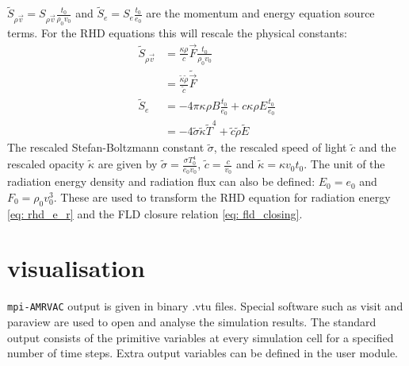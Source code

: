$\tilde{S}_{\rho \vec{v}} = S_{\rho \vec{v}} \frac{t_0}{\rho_0 v_0}$ and $\tilde{S}_e = S_e \frac{t_0}{e_0}$ are the momentum and energy equation source terms. For the RHD equations this will rescale the physical constants:
\begin{align}
	\tilde{S}_{\rho \vec{v}} &=  \frac{\kappa \rho}{c} \vec{F} \frac{t_0}{\rho_0 v_0} \\
							 &=  \frac{\tilde{\kappa}\tilde{\rho}}{\tilde{c}} \tilde{\vec{F}} \\
	\tilde{S}_e &= -4\pi \kappa\rho B \frac{t_0}{e_0}  + c \kappa \rho E \frac{t_0}{e_0} \\
				&= -4 \tilde{\sigma} \tilde{\kappa} \tilde{T}^4 + \tilde{c} \tilde{\rho} \tilde{E}
\end{align}
The rescaled Stefan-Boltzmann constant $\tilde{\sigma}$, the rescaled speed of light $\tilde{c}$ and the rescaled opacity $\tilde{\kappa}$ are given by $\tilde{\sigma} = \frac{\sigma T_0^4}{e_0 v_0}$, $\tilde{c} = \frac{c}{v_0}$ and $\tilde{\kappa} = \kappa v_0 t_0$. The unit of the radiation energy density and radiation flux can also be defined: $E_0 = e_0$ and $F_0 = \rho_0 v_0^3$. These are used to transform the RHD equation for radiation energy \eqref{eq: rhd_e_r} and the FLD closure relation \eqref{eq: fld_closing}. 

\section{visualisation}
\texttt{mpi-AMRVAC} output is given in binary .vtu files. Special software such as visit \citep{} and paraview are used to open and analyse the simulation results. The standard output consists of the primitive variables at every simulation cell for a specified number of time steps. Extra output variables can be defined in the user module.


